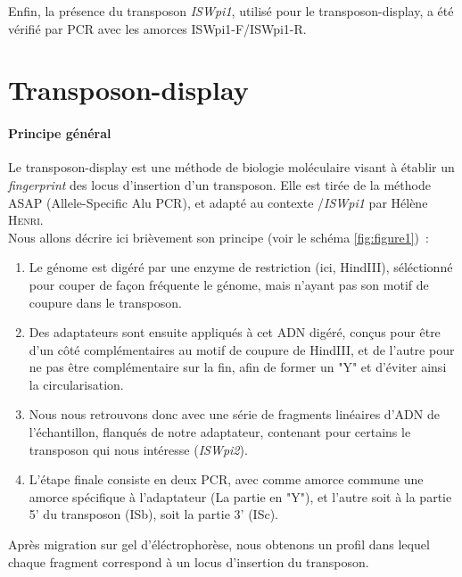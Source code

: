 
Enfin, la présence du transposon \textit{ISWpi1}, utilisé pour le transposon-display, a été vérifié par PCR avec les amorces ISWpi1-F/ISWpi1-R.

\section{Transposon-display} %
\label{sec:transposon_display}

	\paragraph{Principe général} %
	\label{par:principe_TnDisp}
	Le transposon-display est une méthode de biologie moléculaire visant à établir un \textit{fingerprint} des locus d’insertion d’un transposon. 
	Elle est tirée de la méthode ASAP (Allele-Specific Alu PCR)\cite{ASAP}, et adapté au contexte /\textit{ISWpi1} par Hélène \textsc{Henri}\cite{memHH}.\\
	Nous allons décrire ici brièvement son principe (voir le schéma \ref{fig:figure1})~:
	\begin{enumerate}
		\item Le génome est digéré par une enzyme de restriction (ici, HindIII), séléctionné pour couper de façon fréquente le génome, mais n’ayant pas son motif de coupure dans le transposon.
		\item Des adaptateurs
		sont ensuite appliqués à cet ADN digéré, conçus pour être d’un côté complémentaires au motif de coupure de HindIII, et de l’autre pour ne pas être complémentaire sur la fin, afin de former un "Y" et d’éviter ainsi la circularisation.
		\item Nous nous retrouvons donc avec une série de fragments linéaires d’ADN de l’échantillon, flanqués de notre adaptateur, contenant pour certains le transposon qui nous intéresse (\textit{ISWpi2}).
		\item L’étape finale consiste en deux PCR, avec comme amorce commune une amorce spécifique à l’adaptateur (La partie en "Y"), et l’autre soit à la partie 5’ du transposon (ISb), soit la partie 3’ (ISc).
	\end{enumerate}
	Après migration sur gel d’éléctrophorèse, nous obtenons un profil dans lequel chaque fragment correspond à un locus d’insertion du transposon.

